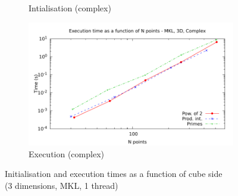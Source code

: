 \documentclass[12pt, a4paper]{article}
\begin{document}
\begin{figure}[H]
\begin{subfigure}{.5\textwidth}
\caption{Intialisation (complex)}
\label{3DMKLCI}
\end{subfigure}%
\begin{subfigure}{.5\textwidth}
\centering
\includegraphics[width=.9\linewidth]{graphs/3d-mkl-exec-c.pdf}
\caption{Execution (complex)}
\label{3DMKLC}
\end{subfigure}
\caption{Initialisation and execution times as a function of cube side\\(3 dimensions, MKL, 1 thread)}
\label{3DMKL}
\end{figure}
\end{document}
